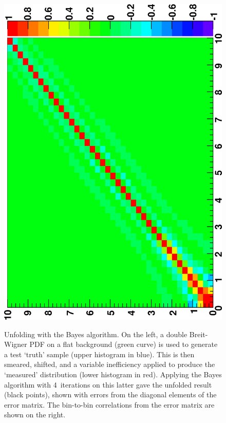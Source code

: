 \documentclass{cernrep}
\begin{document}
\begin{figure}
{                     \includegraphics[angle=-90,width=.338\textwidth,clip]{phystat2011_adye_bayes2.eps}}%
\caption{Unfolding with the Bayes algorithm.
On the left, a double Breit-Wigner PDF on a flat background (green curve) is used to generate
a test `truth' sample (upper histogram in blue).
This is then smeared, shifted, and a variable inefficiency applied to produce
the `measured' distribution (lower histogram in red).
Applying the Bayes algorithm with 4~iterations on this latter gave the unfolded result
(black points), shown with errors from the diagonal elements of the error matrix.
The bin-to-bin correlations from the error matrix are shown on the right.
}\label{Fig:adye:bayes-example}
\end{figure}%
\end{document}
